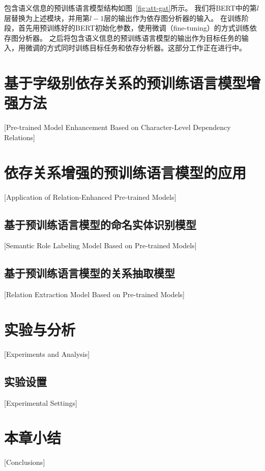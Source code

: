 包含语义信息的预训练语言模型结构如图~\ref{fig:att-gat}所示。
我们将BERT中的第$l$层替换为上述模块，并用第$l-1$层的输出作为依存图分析器的输入。
在训练阶段，首先用预训练好的BERT初始化参数，使用微调（fine-tuning）的方式训练依存图分析器。
之后将包含语义信息的预训练语言模型的输出作为目标任务的输入，用微调的方式同时训练目标任务和依存分析器。这部分工作正在进行中。


\section{基于字级别依存关系的预训练语言模型增强方法}[Pre-trained Model Enhancement Based on Character-Level Dependency Relations]


\section{依存关系增强的预训练语言模型的应用}[Application of Relation-Enhanced Pre-trained Models]

\subsection{基于预训练语言模型的命名实体识别模型}[Semantic Role Labeling Model Based on Pre-trained Models]

\subsection{基于预训练语言模型的关系抽取模型}[Relation Extraction Model Based on Pre-trained Models]


\section{实验与分析}[Experiments and Analysis]

\subsection{实验设置}[Experimental Settings]


\section{本章小结}[Conclusions]


